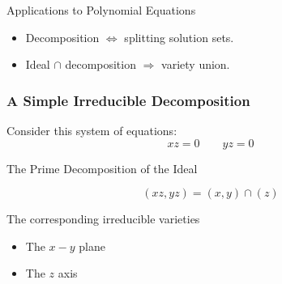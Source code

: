 \documentclass[11pt]{beamer}
\begin{document}
\begin{frame}{Applications to Polynomial Equations}
\begin{itemize}
  \item Decomposition $\Leftrightarrow$ splitting solution sets.
  \item Ideal $\cap$ decomposition $\Rightarrow$ variety union.
\end{itemize}
\centering
{}
\end{frame}

\begin{frame}
\frametitle{A Simple Irreducible Decomposition}

Consider this system of equations:
\[ xz = 0 \qquad yz = 0 \]

The Prime Decomposition of the Ideal

\[ (xz,yz) = (x,y) \cap (z) \]

The corresponding irreducible varieties

\begin{itemize}
\item The $x-y$ plane
\item The $z$ axis
\end{itemize}

\begin{center}

\end{center}
\end{frame}
\end{document}
